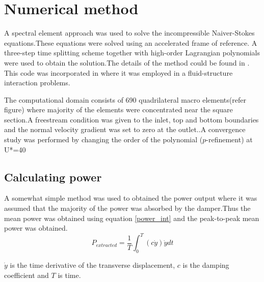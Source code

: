 \section{Numerical method}
A spectral element approach was used to solve the incompressible Naiver-Stokes equations.These equations were solved using an accelerated frame of reference. A three-step time splitting scheme together with high-order Lagrangian polynomials were used to obtain the solution.The details of the method could be found in \cite{Thompson2006,Thompson1996a}. This code was incorporated in \cite{Leontini2011,Leontini2007a}  where it was employed in a fluid-structure interaction problems. 

The computational domain consists of 690 quadrilateral macro elements(refer figure) where majority of the elements were concentrated near the square section.A freestream condition was given to the inlet, top and bottom boundaries and the normal velocity gradient was set to zero at the outlet..A convergence study was performed by changing the order of the polynomial ($p$-refinement) at U*=40 

\subsection{Calculating power}

A somewhat simple method was used to obtained the power output where it was assumed that the majority of the power was absorbed by the damper.Thus the mean power was obtained using equation \eqref{power_int} and the peak-to-peak mean power was obtained. 
\begin{equation}
\label{power_int}
P_{extracted}=\frac{1}{T}\int_0^T(c\dot{y})\dot{y}dt
\end{equation}

$\dot{y}$ is the time derivative of the transverse displacement, $c$ is the damping coefficient and $T$ is time.

